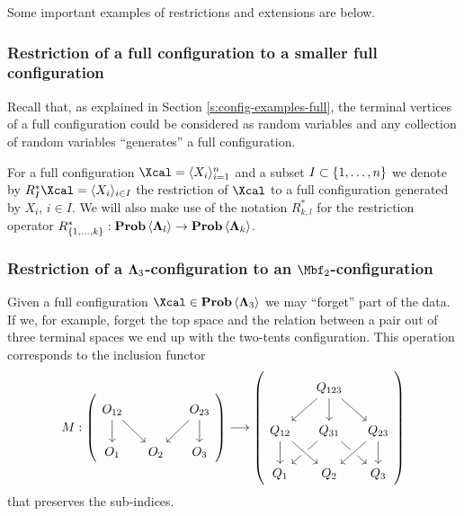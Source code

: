   Some important examples of restrictions and extensions are below.

\subsubsection{Restriction of a full configuration to a smaller full
  configuration} 
\label{s:config-restrictions-fullfull}
  Recall that, as explained in Section
  \ref{s:config-examples-full}, the terminal vertices of a full
  configuration could be considered as random variables and any
  collection of random variables ``generates'' a full configuration.

  For a full configuration $\Xcal=\langle X_{i}\rangle_{i=1}^{n}$ and
  a subset $I\subset\left\{1,\ldots,n\right\}$ we denote by $R_{I}^*\Xcal=\langle
  X_{i}\rangle_{i\in I}$ the restriction of $\Xcal$ to a full
  configuration generated by $X_{i}$, $i\in I$.  We will also make use
  of the notation $R_{k,l}^*$ for the restriction operator $R_{\set{1,\ldots,k}}^*: \prob\<\Lambdabf_l> \to \prob\<\Lambdabf_k>$.

\subsubsection{Restriction of a $\bm\Lambda_{3}$-configuration to
  an $\Mbf_{2}$-configuration}
\label{s:config-restrictions-full2tents}

  Given a full configuration $\Xcal\in\prob\<\Lambdabf_{3}>$ we may
  ``forget'' part of the data. If we, for example, forget the top
  space and the relation between a pair out of three terminal spaces
  we end up with the two-tents configuration. This operation
  corresponds to the inclusion functor
  \[
  M:
  \left(
  \begin{tikzcd}[column sep=small,row sep=normal,ampersand replacement=\&]
    O_{12}
    \arrow{d}{}
    \arrow{dr}{}
    \&
    \&
    O_{23}
    \arrow{d}{}
    \arrow{dl}{}
    \\
    O_{1}
    \&
    O_{2}
    \&
    O_{3}
  \end{tikzcd}
  \right)
  \longrightarrow
  \left(
  \begin{tikzcd}[column sep=small, row sep=normal,ampersand replacement=\&]
    \mbox{}
    \&
    Q_{123}
    \arrow{dl}{}
    \arrow{d}{}
    \arrow{dr}{}
    \\
    Q_{12}
    \arrow{d}{}
    \&
    Q_{31}
    \arrow{dl}{}
    \arrow{dr}{} 
    \&
    Q_{23}
    \arrow{d}
    \\
    Q_{1}
    \&
    Q_{2}
    \arrow[leftarrow, crossing over]{ul}
    \arrow[leftarrow, crossing over]{ur}
    \&
    Q_{3}
  \end{tikzcd}
  \right)
  \]
  that preserves the sub-indices.

